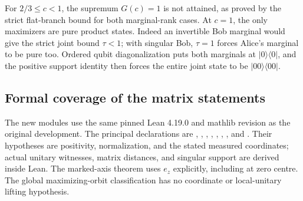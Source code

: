 For \(2/3\leq c<1\), the supremum \(G(c)=1\) is not attained, as proved by
the strict flat-branch bound for both marginal-rank cases.  At \(c=1\),
the only maximizers are pure product states.  Indeed an invertible Bob
marginal would give the strict joint bound \(\tau<1\); with singular Bob,
\(\tau=1\) forces Alice's marginal to be pure too.  Ordered qubit
diagonalization puts both marginals at \(|0\rangle\langle0|\), and the
positive support identity then forces the entire joint state to be
\(|00\rangle\langle00|\).

\subsection{Formal coverage of the matrix statements}

The new modules use the same pinned Lean 4.19.0 and mathlib revision as
the original development.  The principal declarations are
,
,
,
,
,
,
, and
.
Their hypotheses are positivity, normalization, and the stated measured
coordinates; actual unitary witnesses, matrix distances, and singular
support are derived inside Lean.  The marked-axis theorem uses \(e_z\)
explicitly, including at zero centre.  The global maximizing-orbit
classification has no coordinate or local-unitary lifting hypothesis.

